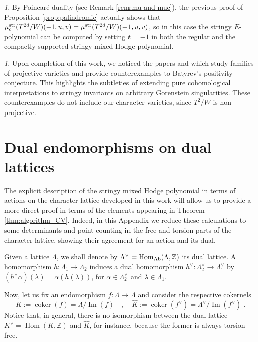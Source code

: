 \documentclass[11pt,english]{amsart}
\numberwithin{equation}{section}
\numberwithin{figure}{section}
\theoremstyle{plain}
\theoremstyle{plain}
\theoremstyle{definition}
\theoremstyle{remark}
\newtheorem{rem}[thm]{\protect\remarkname}
\DeclareMathOperator{\image}{Im}
\newcommand{\ZZ}{\mathbb{Z}}
\newcommand{\coker}{\operatorname{coker}}
\newcommand{\Hom}{\operatorname{Hom}}
\newcommand{\str}{\textup{str}}
\newcommand{\Ab}{\textup{Ab}}
\providecommand{\remarkname}{Remark}
\begin{document}
\begin{rem}
    By Poincar\'e duality (see Remark \ref{rem:mu-and-muc}), the previous proof of Proposition \ref{prop:palindromic} actually shows that $\mu_c^\str(T^{2d}/W)(-1,u,v) = \mu^\str(T^{2d}/W)(-1,u,v)$, so in this case the stringy $E$-polynomial can be computed by setting $t = -1$ in both the regular and the compactly supported stringy mixed Hodge polynomial.
\end{rem}




 
\begin{rem}
    Upon completion of this work, we noticed the papers \cite{SU} and \cite{dais2026unified} which study families of projective varieties and provide counterexamples to Batyrev's positivity conjecture. This highlights the subtleties of extending pure cohomological interpretations to stringy invariants on arbitrary Gorenstein singularities. These counterexamples do not include our character varieties, since $T^2/W$ is non-projective.
\end{rem}




\newpage

\appendix

\section{Dual endomorphisms on dual lattices}\label{app:proof-mirror-symmetry}

The explicit description of the stringy mixed Hodge polynomial in terms of actions on the character lattice developed in this work will allow us to provide a more direct proof in terms of the elements appearing in Theorem \ref{thm:algorithm_CV}. Indeed, in this Appendix we reduce these calculations to some determinants and point-counting in the free and torsion parts of the character lattice, showing their agreement for an action and its dual.



Given a lattice $\Lambda$, we shall denote by $\Lambda^\vee = \Hom_{\Ab}(\Lambda, \ZZ)$ its dual lattice. A homomorphism $h: \Lambda_1 \to \Lambda_2$ induces a dual homomorphism $h^\vee: \Lambda_2^\vee \to \Lambda_1^\vee$ by $(h^\vee\alpha)(\lambda) = \alpha(h(\lambda))$, for $\alpha \in \Lambda_2^\vee$ and $\lambda \in \Lambda_1$.

Now, let us fix an endomorphism $f: \Lambda \to \Lambda$ and consider the respective cokernels
$$
    K:=\coker(f) = \Lambda/\image(f)\quad , \quad \hat{K}:=\coker(f^\vee) = \Lambda^\vee/\image(f^\vee)\; .
$$
Notice that, in general, there is no isomorphism between the dual lattice $K^\vee=\Hom(K, \ZZ)$ and $\hat{K}$, for instance, because the former is always torsion free.
\end{document}
